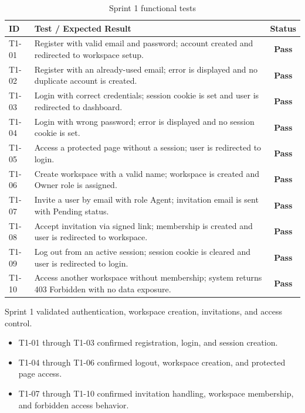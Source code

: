 ﻿\documentclass[12pt,a4paper]{report}
\newcommand{\reporttablesetup}{%
  \small%
  \microtypesetup{activate=false}%
  \setlength{\tabcolsep}{5pt}%
  \renewcommand{\arraystretch}{1.38}%
  \arrayrulecolor{framegray}%
}
\newcommand{\tpass}{\textcolor{passgreen}{\textbf{Pass}}}
\begin{document}
\begin{table}[H]
  \centering
  \renewcommand{\arraystretch}{1.3}
  \footnotesize\reporttablesetup
  \begin{tabular}{|I|L{11.0cm}|C|}
    \hline
    \textbf{ID} & \textbf{Test / Expected Result} & \textbf{Status} \\
    \hline
    T1-01 & Register with valid email and password; account created and redirected to workspace setup. & \tpass \\
    \hline
    T1-02 & Register with an already-used email; error is displayed and no duplicate account is created. & \tpass \\
    \hline
    T1-03 & Login with correct credentials; session cookie is set and user is redirected to dashboard. & \tpass \\
    \hline
    T1-04 & Login with wrong password; error is displayed and no session cookie is set. & \tpass \\
    \hline
    T1-05 & Access a protected page without a session; user is redirected to login. & \tpass \\
    \hline
    T1-06 & Create workspace with a valid name; workspace is created and Owner role is assigned. & \tpass \\
    \hline
    T1-07 & Invite a user by email with role Agent; invitation email is sent with Pending status. & \tpass \\
    \hline
    T1-08 & Accept invitation via signed link; membership is created and user is redirected to workspace. & \tpass \\
    \hline
    T1-09 & Log out from an active session; session cookie is cleared and user is redirected to login. & \tpass \\
    \hline
    T1-10 & Access another workspace without membership; system returns 403 Forbidden with no data exposure. & \tpass \\
    \hline
  \end{tabular}
  \caption{Sprint 1 functional tests}
  \label{tab:test-s1}
\end{table}

\noindent Sprint 1 validated authentication, workspace creation, invitations, and access control.

\begin{itemize}
  \item T1-01 through T1-03 confirmed registration, login, and session creation.
  \item T1-04 through T1-06 confirmed logout, workspace creation, and protected page access.
  \item T1-07 through T1-10 confirmed invitation handling, workspace membership, and forbidden access behavior.
\end{itemize}
\end{document}
